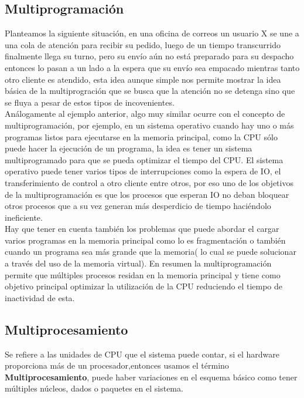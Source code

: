 \documentclass[conference,letterpaper]{IEEEtran}
\begin{document}
\subsection{Multiprogramaci\'on}
Planteamos la siguiente situación, en una oficina de correos un usuario X se une a una cola de atención para recibir su pedido, luego de un tiempo transcurrido finalmente llega su turno, pero su envío aún no está preparado para su despacho entonces lo pasan a un lado a la espera que su envío sea empacado mientras tanto otro cliente es atendido, esta idea aunque simple nos permite mostrar  la idea básica de la multiprogración que se busca que la atención no se detenga sino que se fluya a pesar de estos tipos de incovenientes.\\

An\'{a}logamente al ejemplo anterior, algo muy similar ocurre con  el  concepto  de  multiprogramaci\'{o}n,  por  ejemplo,  en  un sistema  operativo  cuando  hay  uno  o  m\'{a}s  programas  listos para  ejecutarse  en  la  memoria  principal,  como  la  CPU  s\'{o}lo puede  hacer  la  ejecuci\'{o}n  de  un  programa,  la  idea  es  tener un  sistema  multiprogramado  para  que  se  pueda  optimizar  el tiempo del CPU. El sistema operativo puede tener varios tipos de  interrupciones  como  la  espera  de  IO,  el  transferimiento de  control  a  otro  cliente  entre  otros,  por  eso  uno  de  los objetivos   de   la   multiprogramaci\'{o}n   es   que   los   procesos que  esperan  IO  no  deban  bloquear  otros  procesos  que  a  su vez generan m\'{a}s desperdicio de tiempo haci\'{e}ndolo ineficiente.\\

Hay que tener en cuenta tambi\'{e}n los problemas que puede abordar  el  cargar  varios programas  en  la  memoria  principal como  lo  es  fragmentaci\'{o}n  o  tambi\'{e}n  cuando  un  programa sea m\'{a}s grande que la memoria( lo cual se puede solucionar a  trav\'{e}s  del  uso  de  la  memoria  virtual).  En  resumen  la multiprogramaci\'{o}n  permite  que  m\'{u}ltiples  procesos  residan en  la  memoria  principal  y  tiene  como  objetivo  principal optimizar  la  utilizaci\'{o}n  de  la  CPU  reduciendo  el  tiempo  de inactividad de esta.\\

\subsection{Multiprocesamiento}
Se  refiere a  las  unidades de  CPU  que  el  sistema  puede contar,  si  el  hardware  proporciona  m\'{a}s  de  un  procesador,entonces  usamos  el  t\'{e}rmino \textbf{Multiprocesamiento},  puede  haber  variaciones  en  el  esquema  b\'{a}sico  como  tener  m\'{u}ltiples n\'{u}cleos, dados o paquetes en el sistema.
\end{document}
